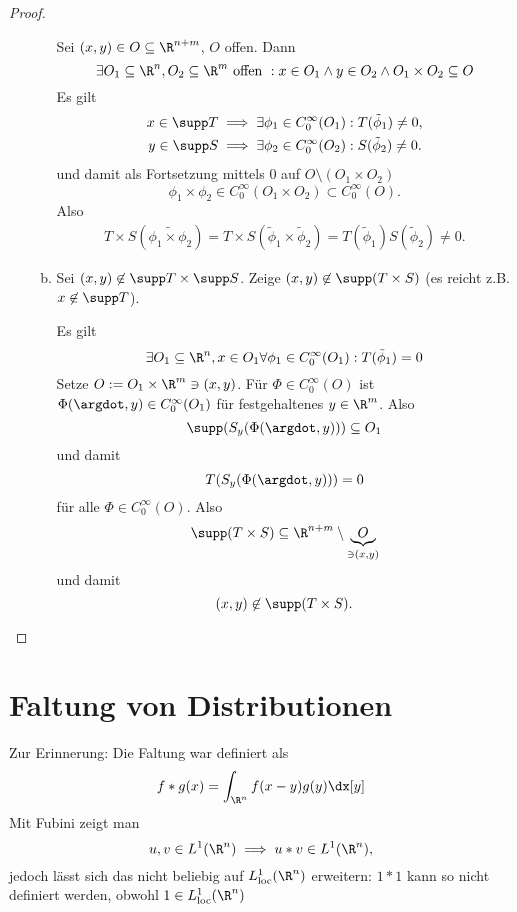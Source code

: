 \begin{st}
\begin{proof}
\begin{enumerate}[1)]
\begin{enumerate}[a)]
						Sei $(x,y) \in O \subset \R^{n+m}$, $O$ offen.
						Dann
						\[
							\exists O_1 \subset \R^n, O_2 \subset \R^m \text{ offen }
								: x \in O_1 \land y \in O_2 \land O_1 \times O_2 \subset O
						\]
						Es gilt
						\begin{align*}
							x \in \supp T
								&\implies \exists \phi_1 \in C_0^\infty(O_1) : T(\tilde \phi_1) \neq 0 ,\\
							y \in \supp S
								&\implies \exists \phi_2 \in C_0^\infty(O_2) : S(\tilde \phi_2) \neq 0.
						\end{align*}
						und damit als Fortsetzung mittels $0$ auf $O \setminus (O_1\times O_2)$
						\[
							\phi_1 \times \phi_2 \in C_0^\infty(O_1\times O_2)
								\subset C_0^\infty(O).
						\]
						Also
						\begin{align*}
							T \times S (\widetilde{\phi_1 \times \phi_2})
							= T \times S(\tilde \phi_1 \times \tilde \phi_2)
							= T(\tilde \phi_1) S(\tilde \phi_2)
							\neq 0.
						\end{align*}
					\item
						Sei $(x,y) \not\in \supp T \times \supp S$.
						Zeige $(x,y) \not\in \supp (T \times S)$ (es reicht z.B. $x \not\in \supp T$).

						Es gilt
						\[
							\exists O_1 \subset \R^n, x \in O_1 \forall \phi_1 \in C_0^\infty(O_1)
							: T(\tilde \phi_1) = 0
						\]
						Setze $O := O_1 \times \R^m \ni (x,y)$.
						Für $\Phi \in C_0^\infty(O)$ ist $\Phi(\argdot, y) \in C_0^\infty(O_1)$ für festgehaltenes $y \in \R^m$.
						Also
						\[
							\supp (S_y(\Phi(\argdot,y))) \subset O_1
						\]
						und damit
						\[
							T(S_y(\Phi(\argdot, y))) = 0
						\]
						für alle $\Phi \in C_0^\infty(O)$.
						Also
						\[
							\supp (T \times S) \subset \R^{n+m} \setminus \underbrace{O}_{\ni (x,y)}
						\]
						und damit
						\[
							(x,y) \not\in \supp(T\times S).
						\]
				\end{enumerate}
		\end{enumerate}
	\end{proof}
\end{st}


\section{Faltung von Distributionen}


Zur Erinnerung: Die Faltung war definiert als
\[
	f \ast g (x) = \int_{\R^n} f(x-y) g(y) \dx[y]
\]
Mit Fubini zeigt man
\[
	u,v \in L^1(\R^n)
	\implies u \ast v \in L^1(\R^n),
\]
jedoch lässt sich das nicht beliebig auf $L^1_{\text{loc}}(\R^n)$ erweitern:
$1 \ast 1$ kann so nicht definiert werden, obwohl $1 \in L^1_{\text{loc}}(\R^n)$

